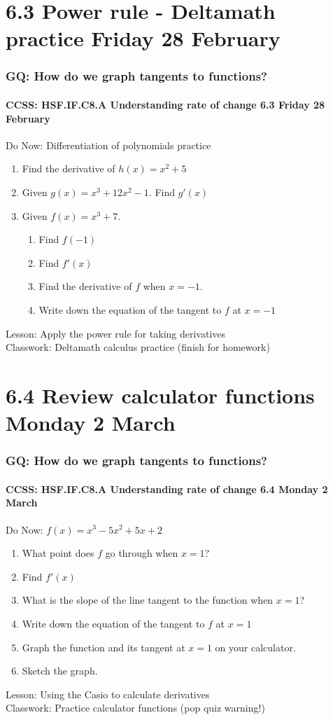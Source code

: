 \documentclass{beamer}
\begin{document}
  \section{6.3 Power rule - Deltamath practice \hfill Friday 28 February}
  \frame
  {
    \frametitle{GQ: How do we graph tangents to functions?}
    \framesubtitle{CCSS: HSF.IF.C8.A Understanding rate of change \hfill \alert{6.3  Friday 28 February}}
    \begin{block}{Do Now: Differentiation of polynomials practice}
      \begin{enumerate}
        \item Find the derivative of $h(x)=x^2+5$
        \item Given $g(x)=x^3 + 12x^2-1$. Find $g'(x)$
        \item Given $f(x)=x^3 + 7$. 
        \begin{enumerate}
          \item Find $f(-1)$
          \item Find $f'(x)$
          \item Find the derivative of $f$ when $x=-1$.
          \item Write down the equation of the tangent to $f$ at $x=-1$
        \end{enumerate}
      \end{enumerate}
      \end{block}
      Lesson: Apply the power rule for taking derivatives\\
      Classwork: Deltamath calculus practice (finish for homework)
      }

  \section{6.4 Review calculator functions \hfill Monday 2 March}
  \frame
  {
    \frametitle{GQ: How do we graph tangents to functions?}
    \framesubtitle{CCSS: HSF.IF.C8.A Understanding rate of change \hfill \alert{6.4 Monday 2 March}}
    \begin{block}{Do Now: $f(x)=x^3-5x^2+5x+2$}
      \begin{enumerate}
        \item What point does $f$ go through when $x=1$?
        \item Find $f'(x)$
        \item What is the slope of the line tangent to the function when $x=1$?
        \item Write down the equation of the tangent to $f$ at $x=1$
        \item Graph the function and its tangent at $x=1$ on your calculator.
        \item Sketch the graph.
      \end{enumerate}
      \end{block}
      Lesson: Using the Casio to calculate derivatives\\
      Classwork: Practice calculator functions (\alert{pop quiz warning!})
      }
      
\end{document}
